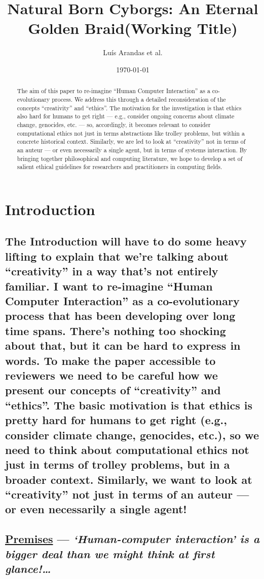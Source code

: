 \documentclass[11pt]{article}
\author{Luís Arandas et al.}
\date{\today}
\title{Natural Born Cyborgs: An Eternal Golden Braid\newline(Working Title)}
\begin{document}
\maketitle
\begin{abstract}
\noindent
The aim of this paper to re-imagine “Human Computer Interaction” as a
co-evolutionary process.  We address this through a detailed
reconsideration of the concepts “creativity” and “ethics”.  The
motivation for the investigation is that ethics also hard for humans
to get right — e.g., consider ongoing concerns about climate change,
genocides, etc. — so, accordingly, it becomes relevant to consider
computational ethics not just in terms abstractions like trolley
problems, but within a concrete historical context.  Similarly, we are
led to look at “creativity” not in terms of an auteur — or even
necessarily a single agent, but in terms of systems interaction.  By
bringing together philosophical and computing literature, we hope to
develop a set of salient ethical guidelines for researchers and
practitioners in computing fields.
\end{abstract}

\setcounter{tocdepth}{1}
\tableofcontents
\section{Introduction}
\label{sec:orga13a53c}
\subsection{The Introduction will have to do some heavy lifting to explain that we're talking about ``creativity'' in a way that's not entirely familiar. I want to re-imagine ``Human Computer Interaction'' as a co-evolutionary process that has been developing over long time spans. There's nothing too shocking about that, but it can be hard to express in words. To make the paper accessible to reviewers we need to be careful how we present our concepts of ``creativity'' and ``ethics''. The basic motivation is that ethics is pretty hard for humans to get right (e.g., consider climate change, genocides, etc.), so we need to think about computational ethics not just in terms of trolley problems, but in a broader context. Similarly, we want to look at “creativity” not just in terms of an auteur — or even necessarily a single agent!}
\label{sec:org1456544}
\subsection{\hyperref[sec:org84f8193]{Premises} — \emph{‘Human-computer interaction’ is a bigger deal than we might think at first glance!\ldots{}}}
\label{sec:org08bda59}
\end{document}
